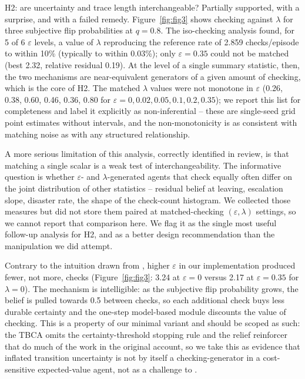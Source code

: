 \documentclass[11pt,a4paper]{article}
\begin{document}
H2: are uncertainty and trace length interchangeable? Partially supported, with a surprise, and with a failed remedy. Figure~\ref{fig:fig3} shows checking against $\lambda$ for three subjective flip probabilities at $q=0.8$. The iso-checking analysis found, for 5 of 6 $\varepsilon$ levels, a value of $\lambda$ reproducing the reference rate of 2.859 checks/episode to within 10\% (typically to within 0.03\%); only $\varepsilon=0.35$ could not be matched (best 2.32, relative residual 0.19). At the level of a single summary statistic, then, the two mechanisms are near-equivalent generators of a given amount of checking, which is the core of H2. The matched $\lambda$ values were not monotone in $\varepsilon$ (0.26, 0.38, 0.60, 0.46, 0.36, 0.80 for $\varepsilon = 0, 0.02, 0.05, 0.1, 0.2, 0.35$); we report this list for completeness and label it explicitly as non-inferential -- these are single-seed grid point estimates without intervals, and the non-monotonicity is as consistent with matching noise as with any structured relationship.

A more serious limitation of this analysis, correctly identified in review, is that matching a single scalar is a weak test of interchangeability. The informative question is whether $\varepsilon$- and $\lambda$-generated agents that check equally often differ on the joint distribution of other statistics -- residual belief at leaving, escalation slope, disaster rate, the shape of the check-count histogram. We collected those measures but did not store them paired at matched-checking $(\varepsilon, \lambda)$ settings, so we cannot report that comparison here. We flag it as the single most useful follow-up analysis for H2, and as a better design recommendation than the manipulation we did attempt.

Contrary to the intuition drawn from \citet{fradkin2020searching}, higher $\varepsilon$ in our implementation produced fewer, not more, checks (Figure~\ref{fig:fig3}: 3.24 at $\varepsilon=0$ versus 2.17 at $\varepsilon=0.35$ for $\lambda=0$). The mechanism is intelligible: as the subjective flip probability grows, the belief is pulled towards 0.5 between checks, so each additional check buys less durable certainty and the one-step model-based module discounts the value of checking. This is a property of our minimal variant and should be scoped as such: the TBCA omits the certainty-threshold stopping rule and the relief reinforcer that do much of the work in the original account, so we take this as evidence that inflated transition uncertainty is not by itself a checking-generator in a cost-sensitive expected-value agent, not as a challenge to \citet{fradkin2020searching}.
\end{document}
